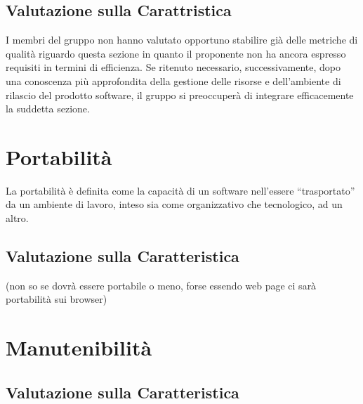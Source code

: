 \subsection{Valutazione sulla Carattristica} \label{3.4.1}
I membri del gruppo non hanno valutato opportuno stabilire già delle metriche di qualità riguardo questa sezione in quanto il proponente non ha ancora espresso requisiti in termini di efficienza. Se ritenuto necessario, successivamente, dopo una conoscenza più approfondita della gestione delle risorse e dell’ambiente di rilascio del prodotto software, il gruppo si preoccuperà di integrare efficacemente la suddetta sezione.

\section{Portabilità} \label{3.5}
La portabilità è definita come la capacità di un software nell’essere “trasportato” da un ambiente di lavoro, inteso sia come organizzativo che tecnologico,  ad un altro.
\subsection{Valutazione sulla Caratteristica} \label{3.5.1}
(non so se dovrà essere portabile o meno, forse essendo web page ci sarà portabilità sui browser)

\section{Manutenibilità} \label{3.6}

\subsection{Valutazione sulla Caratteristica} \label{3.6.1}